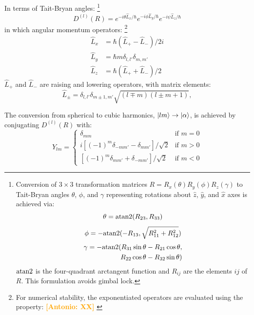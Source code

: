 \documentclass[twocolumn,showpacs,preprintnumbers,superscriptaddress,prb,floatfix,aps,10pt]{revtex4-1}
\newcommand{\abmei}[1]{\textcolor{orange}{ \bf [Antonio: #1] }}
\newcommand*{\wignerDl}{D^{(l)}(R)}
\newcommand*{\x}{\times}
\begin{document}
In terms of Tait-Bryan angles:
%
\footnote{
Conversion of $3\x3$ transformation matrices $R = R_x(\theta)R_y(\phi)R_z(\gamma)$ to Tait-Bryan angles $\theta$, $\phi$, and $\gamma$ representing rotations about $\hat{z}$, $\hat{y}$, and $\hat{x}$ axes is achieved via:
\begin{equation}
\theta = {\rm atan2}(R_{23},R_{33})
\end{equation}
\begin{equation}
\phi   =-{\rm atan2}(-R_{13},\sqrt{R_{11}^2+R_{12}^2})
\end{equation}
\begin{equation}
\begin{split}
\gamma =-{\rm atan2}(R_{31}\sin{\theta}-R_{21}\cos{\theta}, \\ 
       \quad         R_{22}\cos{\theta}-R_{32}\sin{\theta})
\end{split}
\end{equation}
${\rm atan2}$ is the four-quadrant arctangent function and $R_{ij}$ are the elements $ij$ of $R$. This formulation avoids gimbal lock.} 
%
\begin{equation}
\wignerDl = e^{-i\theta\hat{L}_x/\hbar} e^{-i\phi\hat{L}_y/\hbar} e^{-i\psi\hat{L}_z/\hbar}
\end{equation}
%
in which angular momentum operators:
%
\footnote{For numerical stability, the exponentiated operators are evaluated using the property: \abmei{XX} } \cite{shankar_fundamentals_2014}
%
\begin{align}
\label{eq:angular_momenta}
\hat{L}_x & = \hbar (\hat{L}_{+}-\hat{L}_{-})/2i \\
\hat{L}_y & = \hbar m \delta_{l,l'}\delta_{m,m'} \\
\hat{L}_z & = \hbar (\hat{L}_{+}+\hat{L}_{-})/2
\end{align}
$\hat{L}_+$ and $\hat{L}_-$ are raising and lowering operators, with matrix elements:
\begin{equation}
\label{eq:raising_lowering_operator}
\hat{L}_{\pm} = \delta_{l,l'}\delta_{m\pm1,m'} \sqrt{(l\mp m)(l\pm m+1)},
\end{equation}



The conversion from spherical to cubic harmonics, $\ket{lm} \rightarrow \ket{\alpha}$, is achieved by conjugating $\wignerDl$ with:
\begin{equation}
\label{eq:cubic_harmonics}
Y_{lm} = 
\begin{cases}
\delta_{mm}                                      & \text{if } m = 0 \\
 i[(-1)^{m}\delta_{-mm'}-\delta_{ mm'}]/\sqrt{2} & \text{if } m > 0 \\
  [(-1)^{m}\delta_{ mm'}+\delta_{-mm'}]/\sqrt{2} & \text{if } m < 0
\end{cases}
\end{equation}
\end{document}
